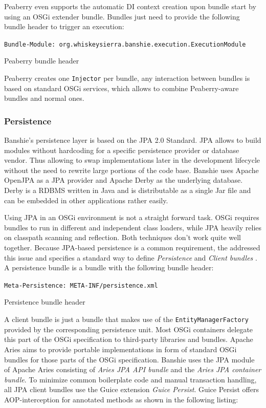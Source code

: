 Peaberry even supports the automatic \gls{DI} context creation upon bundle start by using an OSGi extender bundle. Bundles just need to provide the following bundle header to trigger an execution:

\begin{listing}[H]
\texttt{Bundle-Module: org.whiskeysierra.banshie.execution.ExecutionModule}
\caption{Peaberry bundle header}
\end{listing}

Peaberry creates one \texttt{Injector} per bundle, any interaction between bundles is based on standard OSGi services, which allows to combine Peaberry-aware bundles and normal ones.

\subsubsection{Persistence}
Banshie's persistence layer is based on the \gls{JPA} 2.0 Standard. \gls{JPA} allows to build modules without hardcoding for a specific persistence provider or database vendor. Thus allowing to swap implementations later in the development lifecycle without the need to rewrite large portions of the code base. Banshie uses Apache OpenJPA as a \gls{JPA} provider and Apache Derby as the underlying database. Derby is a \gls{RDBMS} written in Java and is distributable as a single Jar file and can be embedded in other applications rather easily.

Using \gls{JPA} in an \gls{OSGi} environment is not a straight forward task. \gls{OSGi} requires bundles to run in different and independent class loaders, while \gls{JPA} heavily relies on classpath scanning and reflection. Both techniques don't work quite well together. Because \gls{JPA}-based persistence is a common requirement, the  addressed this issue and specifies a standard way to define \textit{Persistence} and \textit{Client bundles} \cite{OSGI:Enterprise}. A persistence bundle is a bundle with the following bundle header:

\begin{listing}[H]
\texttt{Meta-Persistence: META-INF/persistence.xml}
\caption{Persistence bundle header}
\end{listing}

A client bundle is just a bundle that makes use of the \texttt{EntityManagerFactory} provided by the corresponding persistence unit. Most \gls{OSGi} containers delegate this part of the \gls{OSGi} specification to third-party libraries and bundles. Apache Aries aims to provide portable implementations in form of standard \gls{OSGi} bundles for those parts of the \gls{OSGi} specification. Banshie uses the JPA module of Apache Aries consisting of \textit{Aries JPA API bundle} and the \textit{Aries JPA container bundle}. To minimize common boilerplate code and manual transaction handling, all \gls{JPA} client bundles use the Guice extension \textit{Guice Persist}. Guice Persist offers AOP-interception for annotated methods as shown in the following listing:

